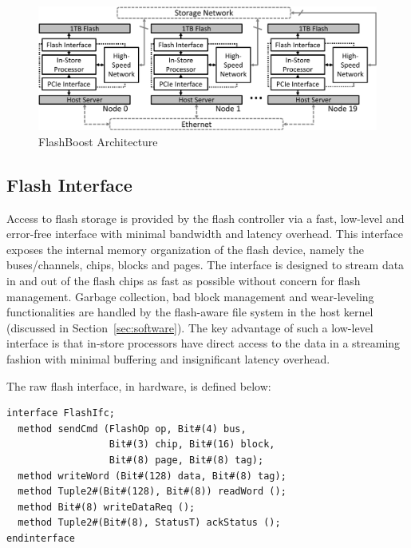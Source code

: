 \begin{figure}[ht]
	\begin{center}
	\includegraphics[width=0.8\paperwidth]{figures/architecture.pdf}
	\caption{FlashBoost Architecture}
	\label{fig:architecture}
	\end{center}
\end{figure}

\subsection{Flash Interface}

Access to flash storage is provided by the flash controller via a
fast, low-level and error-free interface with minimal bandwidth and
latency overhead. This interface exposes the internal memory organization of
the flash device, namely the buses/channels, chips, blocks and pages.
The interface is designed to stream data in
and out of the flash chips as fast as possible without concern for
flash management. Garbage collection, bad block management and
wear-leveling functionalities are handled by the flash-aware file system
in the host kernel (discussed in Section~\ref{sec:software}). The key advantage of such
a low-level interface is that in-store processors have direct access to
the data in a streaming fashion with minimal buffering and insignificant
latency overhead. 

The raw flash interface, in hardware, is defined below:

\begin{lstlisting}
interface FlashIfc;       
  method sendCmd (FlashOp op, Bit#(4) bus,
                  Bit#(3) chip, Bit#(16) block, 
                  Bit#(8) page, Bit#(8) tag);        
  method writeWord (Bit#(128) data, Bit#(8) tag);
  method Tuple2#(Bit#(128), Bit#(8)) readWord (); 
  method Bit#(8) writeDataReq ();
  method Tuple2#(Bit#(8), StatusT) ackStatus ();
endinterface 
\end{lstlisting}

